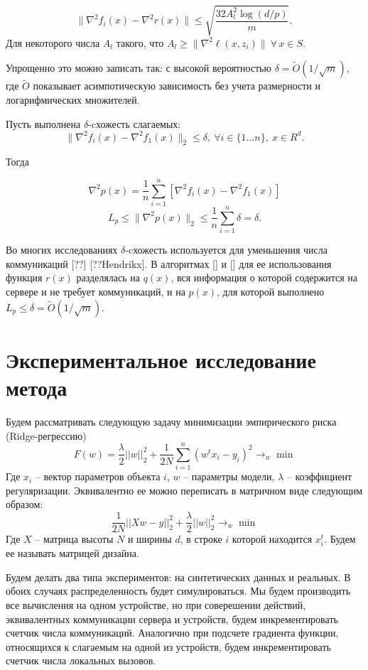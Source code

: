 \documentclass[a4paper,12pt]{extarticle}
\newcommand{\norm}[1]{\|#1\|_{2}}
\begin{document}
\begin{equation}\label{eqn:matrix-hoeffding}
   \biggl\|\nabla^2f_i(x)\!-\!\nabla^2 r(x)\biggr\|
   \!\leq\! \sqrt{\frac{32 A_l^2 \log(d/p)}{m}},
\end{equation}
Для некоторого числа $A_l$ такого, что $A_l \geq \|\nabla^2\ell(x,z_i)\| \ \forall\, x\in S$.


Упрощенно это можно записать так: с высокой вероятностью $\delta=\tilde{O}(1/\sqrt{m})$, где 
$\tilde{O}$ показывает асимпотическую зависимость без учета размерности и логарифмических множителей.


Пусть выполнена $\delta$-cхожесть слагаемых: 
\begin{equation}
    \norm{\nabla^2 f_i(x) - \nabla^2 f_1(x)} \leq \delta, \ \forall i \in \{ 1\ldots n\},\ x\in R^d.
\end{equation}

Тогда

\[\nabla^2 p(x) = \frac1n \sum_{i = 1}^{n} \left[\nabla^2 f_i(x) - \nabla^2 f_1(x) \right]\]
\[L_p \leq \norm{\nabla^2 p(x)} \leq \frac{1}{n} \sum_{i =1}^{n} \delta  = \delta.\]

Во многих исследованиях $\delta$-cхожесть используется для уменьшения числа коммуникаций
[??] [??Hendrikx]. В алгоритмах [] и [] для ее использования 
функция $r(x)$ разделялась на $q(x)$, вся информация о которой содержится на сервере 
и не требует коммуникаций, и на $p(x)$, для которой выполнено $L_p \leq \delta=\tilde{O}(1/\sqrt{m})$. 
 
\section{Экспериментальное исследование метода}
    Будем рассматривать следующую задачу минимизации эмпирического риска (Ridge-регрессию)
    \[ F(w) = \frac{\lambda}{2} ||w||_2^2 + \frac{1}{2N} \sum_{i=1}^n (w^t x_i - y_i)^2 \to_{w} \min \]
     Где $x_i$ -- вектор параметров объекта $i$, $w$ -- параметры модели, $ \lambda $ -- коэффициент регуляризации.
    Эквивалентно ее можно переписать в матричном виде следующим образом: 
        \[\frac{1}{2N}||Xw - y||_2^2 + \frac{\lambda}{2} ||w||_2^2 \to_{w} \min \]
    Где $X$ -- матрица высоты $N$ и ширины $d$, в строке $i$ которой находится $x_i^t$.
    Будем ее называть матрицей дизайна. 
   
    Будем делать два типа экспериментов: на синтетических данных и реальных.
    В обоих случаях распределенность будет симулироваться.
    Мы будем производить все вычисления на одном устройстве, но при соверешении действий,
    эквивалентных коммуникации сервера и устройств, будем инкрементировать счетчик числа коммуникаций.
    Аналогично при подсчете градиента функции, относящихся к слагаемым на одной из устройств,
    будем инкрементировать счетчик числа локальных вызовов. 
\end{document}
